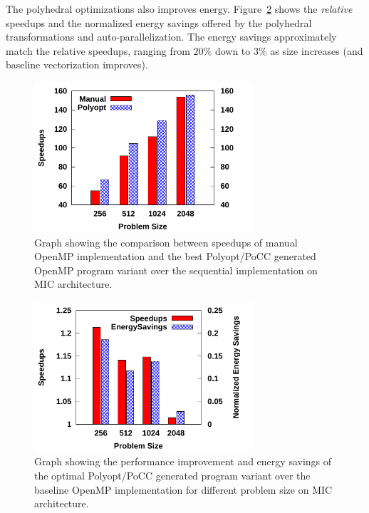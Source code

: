The polyhedral optimizations also improves energy. Figure~\ref{fig:MIC-speedup} shows the \emph{relative} speedups and the
normalized energy savings offered by the polyhedral transformations and auto-parallelization.
The energy savings approximately match the relative speedups, ranging from $20\%$
down to $3\%$ as size increases (and baseline vectorization improves).
\begin{figure}[bt]
    \includegraphics[width=3.2in]{Speedup-over-sequential}
    \caption{Graph showing the comparison between speedups of manual OpenMP implementation and the best
Polyopt/PoCC generated OpenMP program variant over the sequential implementation on MIC architecture.}
    \label{fig:MIC-speedup-over-seq}
\end{figure}
\begin{figure}[bt]
    \includegraphics[width=3.2in]{MIC-Speedups}
    \caption{Graph showing the performance improvement and energy savings of 
the optimal Polyopt/PoCC generated program variant over the baseline OpenMP implementation for different problem size on
MIC architecture.}
    \label{fig:MIC-speedup}
\end{figure}
